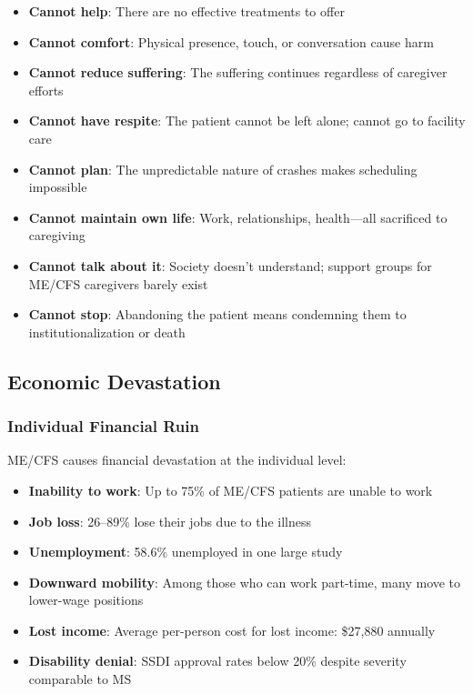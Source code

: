 \begin{itemize}
    \item \textbf{Cannot help}: There are no effective treatments to offer
    \item \textbf{Cannot comfort}: Physical presence, touch, or conversation cause harm
    \item \textbf{Cannot reduce suffering}: The suffering continues regardless of caregiver efforts
    \item \textbf{Cannot have respite}: The patient cannot be left alone; cannot go to facility care
    \item \textbf{Cannot plan}: The unpredictable nature of crashes makes scheduling impossible
    \item \textbf{Cannot maintain own life}: Work, relationships, health---all sacrificed to caregiving
    \item \textbf{Cannot talk about it}: Society doesn't understand; support groups for ME/CFS caregivers barely exist
    \item \textbf{Cannot stop}: Abandoning the patient means condemning them to institutionalization or death
\end{itemize}

\subsection{Economic Devastation}
\label{sec:economic}

\subsubsection{Individual Financial Ruin}
\label{subsec:individual-financial}

ME/CFS causes financial devastation at the individual level:

\begin{itemize}
    \item \textbf{Inability to work}: Up to 75\% of ME/CFS patients are unable to work
    \item \textbf{Job loss}: 26--89\% lose their jobs due to the illness
    \item \textbf{Unemployment}: 58.6\% unemployed in one large study
    \item \textbf{Downward mobility}: Among those who can work part-time, many move to lower-wage positions
    \item \textbf{Lost income}: Average per-person cost for lost income: \$27,880 annually
    \item \textbf{Disability denial}: SSDI approval rates below 20\% despite severity comparable to MS
\end{itemize}

